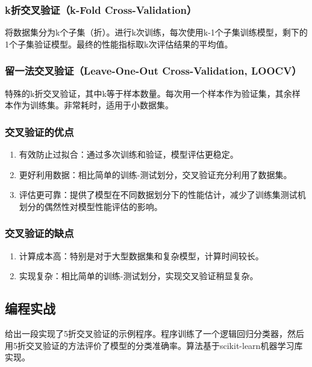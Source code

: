 \subsubsection{k折交叉验证（k-Fold Cross-Validation）}

将数据集分为k个子集（折）。进行k次训练，每次使用k-1个子集训练模型，剩下的1个子集验证模型。最终的性能指标取k次评估结果的平均值。

\subsubsection{留一法交叉验证（Leave-One-Out Cross-Validation, LOOCV）}

特殊的k折交叉验证，其中k等于样本数量。每次用一个样本作为验证集，其余样本作为训练集。非常耗时，适用于小数据集。

\subsubsection{交叉验证的优点}
\begin{enumerate}
\item 有效防止过拟合：通过多次训练和验证，模型评估更稳定。
\item 更好利用数据：相比简单的训练-测试划分，交叉验证充分利用了数据集。
\item 评估更可靠：提供了模型在不同数据划分下的性能估计，减少了训练集测试机划分的偶然性对模型性能评估的影响。
\end{enumerate}

\subsubsection{交叉验证的缺点}
\begin{enumerate}
\item 计算成本高：特别是对于大型数据集和复杂模型，计算时间较长。
\item 实现复杂：相比简单的训练-测试划分，实现交叉验证稍显复杂。
\end{enumerate}

\subsection{编程实战}

给出一段实现了5折交叉验证的示例程序。程序训练了一个逻辑回归分类器，然后用5折交叉验证的方法评价了模型的分类准确率。算法基于scikit-learn机器学习库实现。

